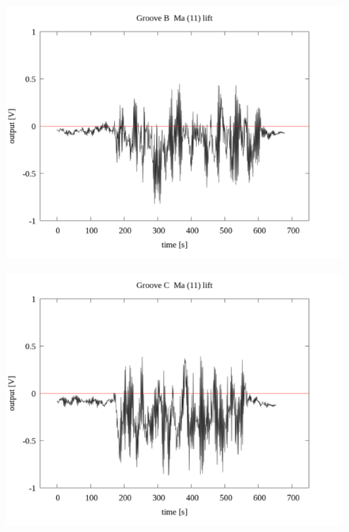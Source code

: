 \documentclass[a4paper]{jsarticle}
\begin{document}
\begin{figure}[htbp]
    \footnotesize
    \begin{center}
        \includegraphics[width=140mm]{../../../33_result/210806/moving_average/11/lift/Groove_B_ma(11)_lift.png}
    \end{center}
\end{figure}

\begin{figure}[htbp]
    \footnotesize
    \begin{center}
        \includegraphics[width=140mm]{../../../33_result/210806/moving_average/11/lift/Groove_C_ma(11)_lift.png}
    \end{center}
\end{figure}
\end{document}
